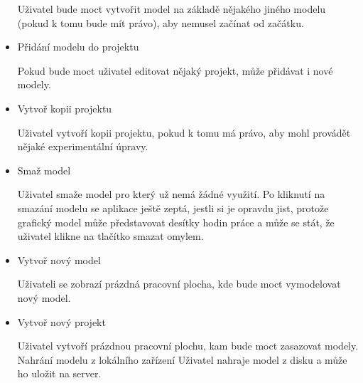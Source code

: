 \documentclass[thesis=B,czech]{FITthesis}[2012/06/26]
\begin{document}
\begin{itemize}
                Uživatel bude moct vytvořit model na základě nějakého jiného modelu (pokud k tomu bude mít právo), aby nemusel začínat od začátku.
                \item Přidání modelu do projektu
                
                Pokud bude moct uživatel editovat nějaký projekt, může přidávat i nové modely.
               \item Vytvoř kopii projektu
               
                Uživatel vytvoří kopii projektu, pokud k tomu má právo, aby mohl provádět nějaké experimentální úpravy.
               \item Smaž model
               
                Uživatel smaže model pro který už nemá žádné využití. Po kliknutí na smazání modelu se aplikace ještě zeptá, jestli si je opravdu jist, protože grafický model může představovat desítky hodin práce a může se stát, že uživatel klikne na tlačítko smazat omylem.
                \item Vytvoř nový model
                
                Uživateli se zobrazí prázdná pracovní plocha, kde bude moct vymodelovat nový model.
                \item Vytvoř nový projekt
                
                Uživatel vytvoří prázdnou pracovní plochu, kam bude moct zasazovat modely.
                Nahrání modelu z lokálního zařízení
                Uživatel nahraje model z disku a může ho uložit na server.
            \end{itemize}
\end{document}
